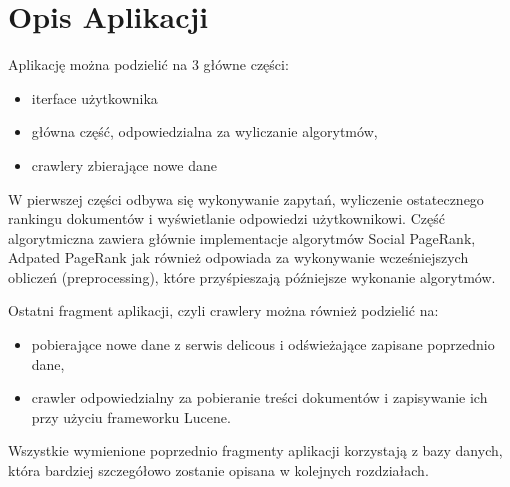 \section{Opis Aplikacji}

Aplikację można podzielić na 3 główne części:

\begin{itemize}
\item iterface użytkownika 
\item główna część, odpowiedzialna za wyliczanie algorytmów, 
\item crawlery zbierające nowe dane 
\end{itemize}

W pierwszej części odbywa się wykonywanie zapytań, wyliczenie ostatecznego rankingu dokumentów i wyświetlanie odpowiedzi użytkownikowi. Część algorytmiczna zawiera głównie implementacje algorytmów Social PageRank, Adpated PageRank jak również odpowiada za wykonywanie wcześniejszych obliczeń (preprocessing), które przyśpieszają późniejsze wykonanie algorytmów. 

Ostatni fragment aplikacji, czyli crawlery można również podzielić na: 
\begin{itemize}
\item pobierające nowe dane z serwis delicous i odświeżające zapisane poprzednio dane, 
\item  crawler odpowiedzialny za pobieranie treści dokumentów i zapisywanie ich przy użyciu frameworku Lucene. 
\end{itemize}

Wszystkie wymienione poprzednio fragmenty aplikacji korzystają z bazy danych, która bardziej szczegółowo zostanie opisana w kolejnych rozdziałach.